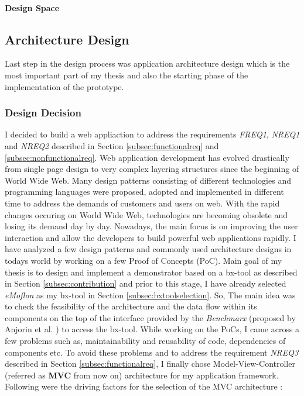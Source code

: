 \paragraph{Design Space} 

\subsection{Architecture Design}\label{subsec:architecturedesign}
Last step in the design process was application architecture design which is the most important part of my thesis and also the starting phase of the implementation of the prototype.

\subsubsection{Design Decision}\label{subsubsec:architecturedesigndecision}
I decided to build a web appliaction to address the requirements \textit{FREQ1}, \textit{NREQ1} and \textit{NREQ2} described in Section \ref{subsec:functionalreq} and \ref{subsec:nonfunctionalreq}.
\newline\newline Web application development has evolved drastically from single page design to very complex layering structures since the beginning of World Wide Web. Many design patterns \cite{designpattern} \cite{designpattern-notes} consisting of different technologies and programming languages were proposed, adopted and implemented in different time to address the demands of customers and users on web. With the rapid changes occuring on World Wide Web, technologies are becoming obsolete and losing its demand day by day. Nowadays, the main focus is on improving the user interaction and allow the developers to build powerful web applications rapidly.
\newline\newline I have analyzed a few design patterns and commonly used architecture designs in todays world by working on a few Proof of Concepts (PoC). Main goal of my thesis is to design and implement a demonstrator based on a bx-tool as described in Section \ref{subsec:contribution} and prior to this stage, I have already selected \textit{eMoflon} as my bx-tool in Section \ref{subsec:bxtoolselection}. So, The main idea was to check the feasibility of the architecture and the data flow within its components on the top of the interface provided by the \textit{Benchmarx} (proposed by Anjorin et al. \cite{benchmarx-reload}) to access the bx-tool. While working on the PoCs, I came across a few problems such as, maintainability and reusability of code, dependencies of components etc. To avoid these problems and to address the requirement \textit{NREQ3} described in Section \ref{subsec:functionalreq}, I finally chose Model-View-Controller (referred as \textbf{MVC} from now on) architecture for my application framework. Following were the driving factors for the selection of the MVC architecture \cite{designpattern-notes} \cite{designpattern-headfirst} :
